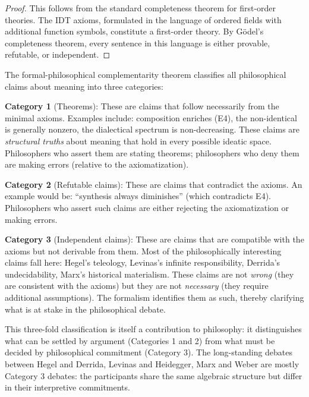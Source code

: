 \begin{proof}
This follows from the standard completeness theorem for first-order theories.
The IDT axioms, formulated in the language of ordered fields with additional
function symbols, constitute a first-order theory. By G\"odel's completeness
theorem, every sentence in this language is either provable, refutable, or
independent.
\end{proof}

\begin{interpretation}
The formal-philosophical complementarity theorem classifies all philosophical
claims about meaning into three categories:

\textbf{Category 1} (Theorems): These are claims that follow necessarily from
the minimal axioms. Examples include: composition enriches (E4), the
non-identical is generally nonzero, the dialectical spectrum is non-decreasing.
These claims are \emph{structural truths} about meaning that hold in every
possible ideatic space. Philosophers who assert them are stating theorems;
philosophers who deny them are making errors (relative to the axiomatization).

\textbf{Category 2} (Refutable claims): These are claims that contradict
the axioms. An example would be: ``synthesis always diminishes'' (which
contradicts E4). Philosophers who assert such claims are either rejecting
the axiomatization or making errors.

\textbf{Category 3} (Independent claims): These are claims that are
compatible with the axioms but not derivable from them. Most of the
philosophically interesting claims fall here: Hegel's teleology, Levinas's
infinite responsibility, Derrida's undecidability, Marx's historical
materialism. These claims are not \emph{wrong} (they are consistent with
the axioms) but they are not \emph{necessary} (they require additional
assumptions). The formalism identifies them as such, thereby clarifying
what is at stake in the philosophical debate.

This three-fold classification is itself a contribution to philosophy:
it distinguishes what can be settled by argument (Categories 1 and 2) from
what must be decided by philosophical commitment (Category 3). The
long-standing debates between Hegel and Derrida, Levinas and Heidegger,
Marx and Weber are mostly Category 3 debates: the participants share the
same algebraic structure but differ in their interpretive commitments.
\end{interpretation}


